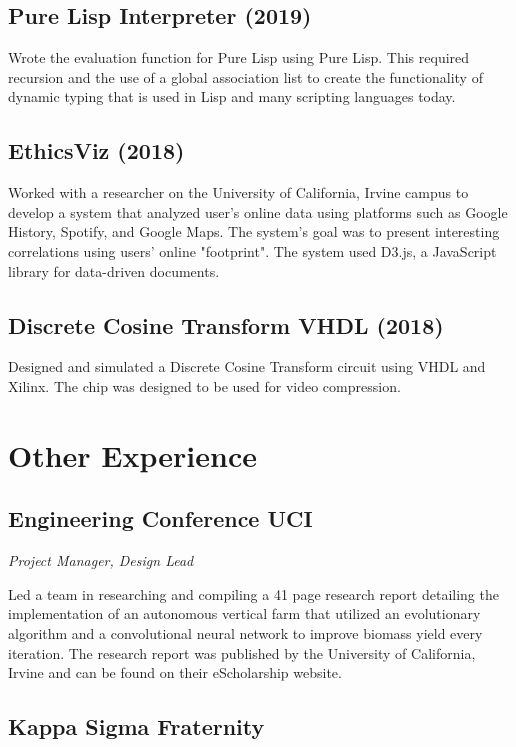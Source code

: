 \documentclass{article}
\begin{document}
\subsection{Pure Lisp Interpreter (2019)}

Wrote the evaluation function for Pure Lisp using Pure Lisp. This required recursion and the use of a global 
association list to create the functionality of dynamic typing that is used in Lisp and many scripting languages today.

\subsection{EthicsViz (2018)}

Worked with a researcher on the University of California, Irvine campus to develop a system that analyzed 
user's online data using platforms such as Google History, Spotify, and Google Maps. The system's goal was to present interesting correlations using users' online "footprint".  The system used D3.js, a JavaScript library for data-driven documents. 

\subsection{Discrete Cosine Transform VHDL (2018)}

Designed and simulated a Discrete Cosine Transform circuit using VHDL and Xilinx. The chip was designed to be 
used for video compression. 

\section{Other Experience}

\subsection{Engineering Conference UCI}

\noindent\textit{Project Manager, Design Lead}

Led a team in researching and compiling a 41 page research report detailing the implementation of an 
autonomous vertical farm that utilized an evolutionary algorithm and a convolutional neural network 
to improve biomass yield every iteration. The research report was published by the University of 
California, Irvine and can be found on their eScholarship website.

\subsection{Kappa Sigma Fraternity}
\end{document}

